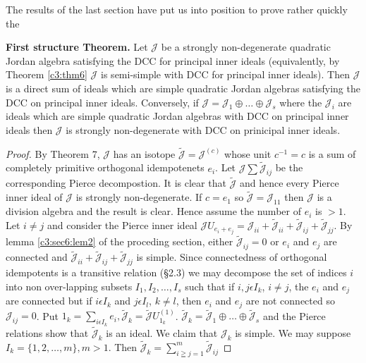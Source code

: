 The results of the last section have put us into position to prove
rather quickly the 

\noindent
{\textbf{First structure Theorem.}}
Let $\mathscr{J}$ be a strongly non-degenerate qua\-dra\-tic Jordan
algebra satisfying the DCC for principal inner ideals (equivalently,
by Theorem \ref{c3:thm6} $\mathscr{J}$ is semi-simple with DCC for principal
inner ideals). Then $\mathscr{J}$ is a direct sum of ideals which are
simple quadratic Jordan algebras satisfying the DCC on principal inner
ideals. Conversely, if $\mathscr{J}=\mathscr{J}_1\oplus\ldots\oplus
\mathscr{J}_s$ where the $\mathscr{J}_i$ are ideals which are simple
quadratic Jordan algebras with DCC on principal inner ideals then
$\mathscr{J}$ is strongly non-degenerate with DCC on prinicipal inner ideals.

\begin{proof}
By Theorem 7, $\mathscr{J}$ has an isotope
$\tilde{\mathscr{J}}=\mathscr{J}^{(c)}$ whose unit $c^{-1}=c$ is a sum of
completely primitive orthogonal idempotenets $e_i$. Let
$\mathscr{J}\sum\tilde{\mathscr{J}}_{ij}$ be the corresponding Pierce
decompostion. It is clear that $\tilde{\mathscr{J}}$ and hence every
Pierce inner ideal of $\mathscr{J}$ is strongly non-degenerate. If
$c=e_1$ so $\tilde{\mathscr{J}}=\mathscr{J}_{11}$ then $\mathscr{J}$ is  a
division algebra and the result is clear. Hence assume\pageoriginale
the number of $e_i$ is $>1$. Let $i\neq j$ and consider the Pierce
inner ideal
$\mathscr{J}U_{e_i+e_j}=\mathscr{J}_{ii}+\tilde{\mathscr{J}}_{ii}+\tilde{\mathscr{J}}_{ij}+\tilde{\mathscr{J}}_{jj}$. By
lemma \ref{c3:sec6:lem2} of the proceding section, either
$\tilde{\mathscr{J}}_{ij}=0$ 
or $e_i$ and $e_j$ are connected and
$\tilde{\mathscr{J}}_{ii}+\tilde{\mathscr{J}}_{ij}+\tilde{\mathscr{J}}_{jj}$
is simple. Since connectedness of orthogonal idempotents is a
transitive relation (\S 2.3) we may decompose the set of indices $i$
into non over-lapping subsets $I_1, I_2,\ldots,I_s$ such that if
$i,j\epsilon I_k$, $i\neq j$, the $e_i$ and $e_j$ are connected but if
$i\epsilon I_k$ and $j\epsilon I_l$, $k\neq l$, then $e_i$ and $e_j$
are not connected so $\mathscr{J}_{ij}=0$. Put
$1_k=\sum\limits_{i\epsilon I_k}e_i, \tilde{\mathscr{J}}_k
=\tilde{\mathscr{J}}U_{1_k}^{(1)}$. 
$\tilde{\mathscr{J}}_{k}=\tilde{\mathscr{J}}_1\oplus\ldots \oplus
\tilde{\mathscr{J}}_s$ and the Pierce relations show that
$\tilde{\mathscr{J}}_k$ is an ideal. We claim that $\mathscr{J}_k$ is
simple. We may suppose $I_k=\{1,2,\ldots,m\},m>1$. Then
$\tilde{\mathscr{J}}_k=\sum\limits_{i\geqq j=1}^{m}\tilde{\mathscr{J}}_{ij}$

\end{proof}
